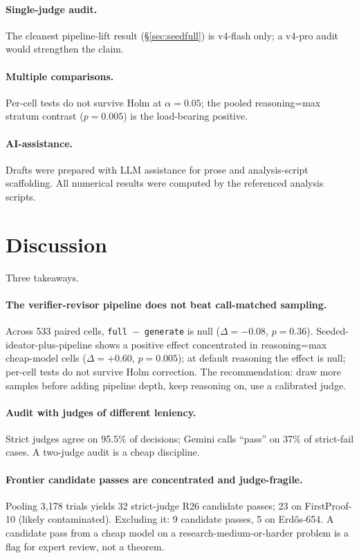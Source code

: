 \documentclass{article}
\begin{document}
\paragraph{Single-judge audit.}
The cleanest pipeline-lift result (\S\ref{sec:seedfull}) is v4-flash only; a v4-pro
audit would strengthen the claim.

\paragraph{Multiple comparisons.}
Per-cell tests do not survive Holm at $\alpha{=}0.05$; the pooled reasoning=max
stratum contrast ($p{=}0.005$) is the load-bearing positive.

\paragraph{AI-assistance.}
Drafts were prepared with LLM assistance for prose and analysis-script
scaffolding.
All numerical results were computed by the referenced analysis scripts.

\section{Discussion}
\label{sec:discussion}

Three takeaways.

\paragraph{The verifier-revisor pipeline does not beat call-matched sampling.}
Across 533 paired cells, \texttt{full}~$-$~\texttt{generate} is null
($\Delta{=}{-}0.08$, $p{=}0.36$).
Seeded-ideator-plus-pipeline shows a positive effect concentrated in reasoning=max
cheap-model cells ($\Delta{=}{+}0.60$, $p{=}0.005$); at default reasoning the
effect is null; per-cell tests do not survive Holm correction.
The recommendation: draw more samples before adding pipeline depth, keep reasoning
on, use a calibrated judge.

\paragraph{Audit with judges of different leniency.}
Strict judges agree on 95.5\% of decisions; Gemini calls ``pass'' on 37\% of
strict-fail cases.
A two-judge audit is a cheap discipline.

\paragraph{Frontier candidate passes are concentrated and judge-fragile.}
Pooling 3{,}178 trials yields 32 strict-judge R26 candidate passes; 23 on
FirstProof-10 (likely contaminated).
Excluding it: 9 candidate passes, 5 on Erd\H{o}s-654.
A candidate pass from a cheap model on a research-medium-or-harder problem is a
flag for expert review, not a theorem.
\end{document}
